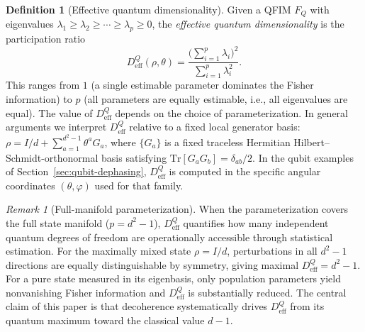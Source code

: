 \documentclass[12pt,a4paper]{article}
\theoremstyle{definition}
\newtheorem{definition}[theorem]{Definition}
\theoremstyle{remark}
\newtheorem{remark}[theorem]{Remark}
\begin{document}
\begin{definition}[Effective quantum dimensionality]
\label{def:deff}
Given a QFIM $F_Q$ with eigenvalues $\lambda_1 \geq \lambda_2 \geq \cdots \geq \lambda_p \geq 0$, the \emph{effective quantum dimensionality} is the participation ratio
\begin{equation}
\label{eq:deff}
D_{\mathrm{eff}}^Q(\rho, \theta) = \frac{\bigl(\sum_{i=1}^p \lambda_i\bigr)^2}{\sum_{i=1}^p \lambda_i^2}.
\end{equation}
This ranges from $1$ (a single estimable parameter dominates the Fisher information) to $p$ (all parameters are equally estimable, i.e., all eigenvalues are equal).  The value of $D_{\mathrm{eff}}^Q$ depends on the choice of parameterization.  In general arguments we interpret $D_{\mathrm{eff}}^Q$ relative to a fixed local generator basis: $\rho = I/d + \sum_{a=1}^{d^2-1} \theta^a G_a$, where $\{G_a\}$ is a fixed traceless Hermitian Hilbert--Schmidt-orthonormal basis satisfying $\mathrm{Tr}[G_a G_b] = \delta_{ab}/2$.  In the qubit examples of Section~\ref{sec:qubit-dephasing}, $D_{\mathrm{eff}}^Q$ is computed in the specific angular coordinates $(\theta,\varphi)$ used for that family.
\end{definition}

\begin{remark}[Full-manifold parameterization]
\label{rem:full-param}
When the parameterization covers the full state manifold ($p = d^2 - 1$), $D_{\mathrm{eff}}^Q$ quantifies how many independent quantum degrees of freedom are operationally accessible through statistical estimation. For the maximally mixed state $\rho = I/d$, perturbations in all $d^2 - 1$ directions are equally distinguishable by symmetry, giving maximal $D_{\mathrm{eff}}^Q = d^2 - 1$. For a pure state measured in its eigenbasis, only population parameters yield nonvanishing Fisher information and $D_{\mathrm{eff}}^Q$ is substantially reduced. The central claim of this paper is that decoherence systematically drives $D_{\mathrm{eff}}^Q$ from its quantum maximum toward the classical value $d - 1$.
\end{remark}
\end{document}
